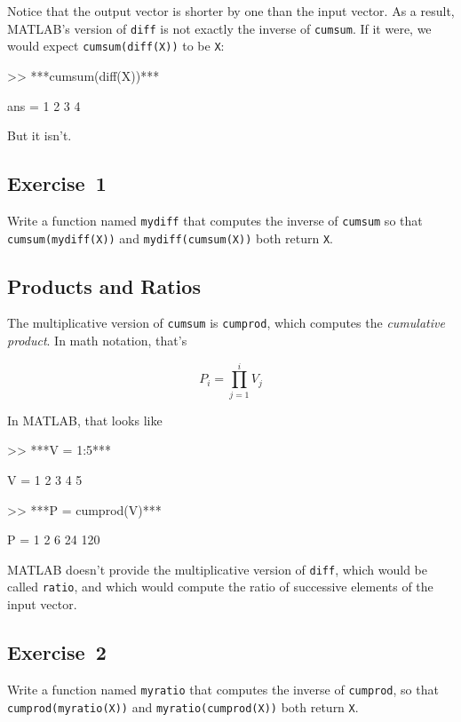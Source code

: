Notice that the output vector is shorter by one than the input
vector.  As a result, MATLAB's version of \lstinline{diff} is not
exactly the inverse of \lstinline{cumsum}.  If it were, we would
expect \lstinline{cumsum(diff(X))} to be \lstinline{X}:

\begin{code}
>> ***cumsum(diff(X))***

ans = 1     2     3     4
\end{code}

But it isn't.

\subsection{Exercise~1}
Write a function named \lstinline{mydiff} that computes the
inverse of \lstinline{cumsum} so that \lstinline{cumsum(mydiff(X))} and
\lstinline{mydiff(cumsum(X))} both return \lstinline{X}.



\subsection{Products and Ratios}

The multiplicative version of \lstinline{cumsum} is \lstinline{cumprod},
which computes the \emph{cumulative product}.  In math notation,
that's


\begin{equation*}
P_i = \prod_{j=1}^i V_j
\end{equation*}

In MATLAB, that looks like

\begin{code}
>> ***V = 1:5***

V = 1     2     3     4     5

>> ***P = cumprod(V)***

P = 1     2     6    24   120
\end{code}

MATLAB doesn't provide the multiplicative version
of \lstinline{diff}, which would be called \lstinline{ratio}, and which would
compute the ratio of successive elements of the input vector.

\subsection{Exercise~2}
Write a function named \lstinline{myratio} that computes the
inverse of \lstinline{cumprod}, so that \lstinline{cumprod(myratio(X))} and
\lstinline{myratio(cumprod(X))} both
return \lstinline{X}.

